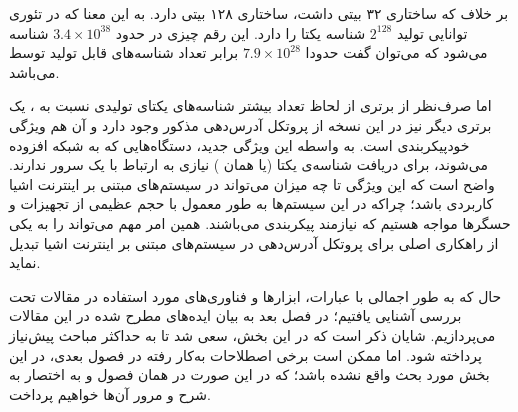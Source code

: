 \par
{}
بر خلاف  که ساختاری ۳۲ بیتی داشت، ساختاری ۱۲۸ بیتی دارد. به این معنا که در تئوری توانایی تولید $2^{128}$ شناسه یکتا را دارد. این رقم چیزی در حدود $3.4 \times 10^{38}$ شناسه می‌شود که می‌توان گفت حدودا $7.9 \times 10^{28}$ برابر تعداد شناسه‌های قابل تولید توسط  می‌باشد.

\par
اما صرف‌نظر از برتری  از لحاظ تعداد بیشتر شناسه‌های یکتای تولیدی نسبت به ، یک برتری دیگر نیز در این نسخه از پروتکل آدرس‌دهی مذکور وجود دارد و آن هم ویژگی خودپیکربندی است. به واسطه این ویژگی جدید، دستگاه‌هایی که به شبکه افزوده می‌شوند، برای دریافت شناسه‌ی یکتا (یا همان ) نیازی به ارتباط با یک سرور 
ندارند. واضح است که این ویژگی تا چه میزان می‌تواند در سیستم‌های مبتنی بر اینترنت اشیا کاربردی باشد؛ چراکه در این سیستم‌ها به طور معمول با حجم عظیمی از تجهیزات و حسگرها مواجه هستیم که نیازمند پیکربندی می‌باشند. همین امر مهم می‌تواند  را به یکی از راهکاری اصلی برای پروتکل آدرس‌دهی در سیستم‌های مبتنی بر اینترنت اشیا تبدیل نماید.

\par
حال که به طور اجمالی با عبارات، ابزارها و فناوری‌های مورد استفاده در مقالات تحت بررسی آشنایی یافتیم؛ در فصل بعد به بیان ‌ایده‌های مطرح شده در این مقالات می‌پردازیم. شایان ذکر است که در این بخش، سعی شد تا به حداکثر مباحث پیش‌نیاز پرداخته شود. اما ممکن است برخی اصطلاحات به‌کار رفته در فصول بعدی، در این بخش مورد بحث واقع نشده باشد؛ که در این صورت در همان فصول و به اختصار به شرح و مرور آن‌ها خواهیم پرداخت.










